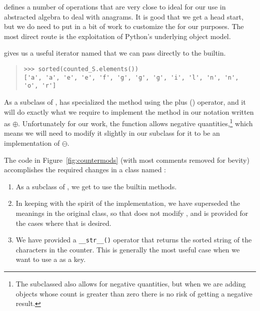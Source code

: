 \documentclass[letterpaper, 11pt]{article}
\begin{document}
 defines a number of operations that are very close
to ideal for our use in abstracted algebra to deal with anagrams.
It is good that we get a head start, but we do need to put in
a bit of work to customize the  for our purposes.  The
most direct route is the exploitation of Python's underlying object
model.

 gives us a useful iterator named  that
we can pass directly to the  builtin.  

\begin{quote}
\small
\begin{verbatim}
>>> sorted(counted_S.elements())
['a', 'a', 'e', 'e', 'f', 'g', 'g', 'g', 'i', 'l', 'n', 'n', 'o', 'r']
\end{verbatim}
\end{quote}

As a subclass of ,  has specialized the
 method using the plus (\lit{+}) operator, and it will do
exactly what we require to implement the method in our notation
written as $\oplus$. Unfortunately for our work, the 
function allows negative quantities,\footnote{The subclassed
 also allows for negative quantities, but when we are
adding objects whose count is greater than zero there is no risk
of getting a negative result.} which means we will need to modify
it slightly in our subclass for it to be an implementation of
$\ominus$.

The code in Figure~\ref{fig:countermods} (with most comments removed for bevity)
accomplishes the required changes in a class named :

\begin{enumerate}
\item As a subclass of , we get to use the builtin
methods.

\item In keeping with the spirit of the  implementation,
we have superseded the meanings in the original class, so that  does
not modify , and  is provided for the cases where that is
desired.

\item We have provided a \verb|__str__()| operator that returns the
sorted string of the characters in the counter. This is generally the
most useful case when we want to use a  as 
a key. 

\end{enumerate}
\end{document}
